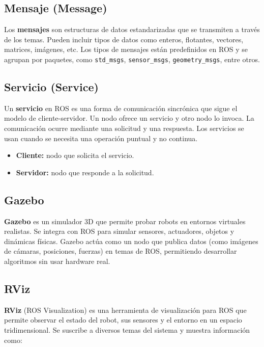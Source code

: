 \subsection{Mensaje (Message)}

Los \textbf{mensajes} son estructuras de datos estandarizadas que se transmiten a través de los temas. Pueden incluir tipos de datos como enteros, flotantes, vectores, matrices, imágenes, etc. Los tipos de mensajes están predefinidos en ROS y se agrupan por paquetes, como \texttt{std\_msgs}, \texttt{sensor\_msgs}, \texttt{geometry\_msgs}, entre otros.


\subsection{Servicio (Service)}

Un \textbf{servicio} en ROS es una forma de comunicación sincrónica que sigue el modelo de cliente-servidor. Un nodo ofrece un servicio y otro nodo lo invoca. La comunicación ocurre mediante una solicitud y una respuesta. Los servicios se usan cuando se necesita una operación puntual y no continua.


\begin{itemize}
	\item \textbf{Cliente:} nodo que solicita el servicio.
	\item \textbf{Servidor:} nodo que responde a la solicitud.
\end{itemize}


\subsection{Gazebo}


\textbf{Gazebo} es un simulador 3D que permite probar robots en entornos virtuales realistas. Se integra con ROS para simular sensores, actuadores, objetos y dinámicas físicas. Gazebo actúa como un nodo que publica datos (como imágenes de cámaras, posiciones, fuerzas) en temas de ROS, permitiendo desarrollar algoritmos sin usar hardware real.


\subsection{RViz}

\textbf{RViz} (ROS Visualization) es una herramienta de visualización para ROS que permite observar el estado del robot, sus sensores y el entorno en un espacio tridimensional. Se suscribe a diversos temas del sistema y muestra información como:


